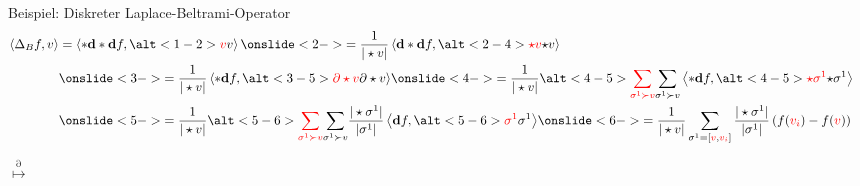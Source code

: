 \documentclass{beamer}
\newcommand{\exd}{\mathbf{d}}
\newcommand{\tred}[1]{\textcolor{red}{#1}}
\begin{document}
  \begin{frame}
    \begin{block}{Beispiel: Diskreter Laplace-Beltrami-Operator}
    \small
      \begin{align*}
        \left\langle \Delta_{B}f, v \right\rangle 
            &= \left\langle *\exd*\exd f, \alt<1-2>{\tred{v}}{v} \right\rangle
            \onslide<2->{= \frac{1}{|\star v|}\left\langle \exd*\exd f, \alt<2-4>{\tred{\star v}}{\star v} \right\rangle}&\\
            &\onslide<3->{= \frac{1}{|\star v|}\left\langle *\exd f, \alt<3-5>{\tred{\partial\star v}}{\partial\star v} \right\rangle}
            \onslide<4->{=\frac{1}{|\star v|}\alt<4-5>{\tred{\sum_{\sigma^{1}\succ v}}}{\sum_{\sigma^{1}\succ v}}\left\langle *\exd f, \alt<4-5>{\tred{\star\sigma^{1}}}{\star\sigma^{1}}
                                  \right\rangle}&\\
            &\onslide<5->{=\frac{1}{|\star v|}\alt<5-6>{\tred{\sum_{\sigma^{1}\succ v}}}{\sum_{\sigma^{1}\succ v}} \frac{|\star\sigma^{1}|}{|\sigma^{1}|}
                          \left\langle \exd f, \alt<5-6>{\tred{\sigma^{1}}}{\sigma^{1}}\right\rangle}
            \onslide<6->{=\frac{1}{|\star v|}\sum_{\sigma^{1}=\left[ \tred{v},\tred{v_{i}} \right]} \frac{|\star\sigma^{1}|}{|\sigma^{1}|}
                          \left( f(\tred{v_{i}}) - f(\tred{v}) \right)}
      \end{align*}
    \end{block}
    \begin{overprint}
          \begin{minipage}{0.4\textwidth}
            \centering 
          \end{minipage}\hfill
          \begin{minipage}{0.4\textwidth}
            \centering 
          \end{minipage}\hfill
          {\Huge\(\overset{\partial}{\longmapsto}\)}  \hfill
          \begin{minipage}{0.4\textwidth}
            \centering 
          \end{minipage}
          \begin{minipage}{0.4\textwidth}

\end{minipage}
\end{overprint}
\end{frame}
\end{document}
